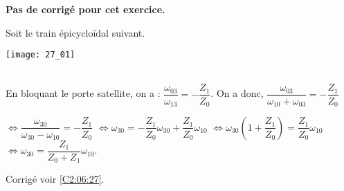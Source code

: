 \normaltrue \difficilefalse \tdifficilefalse
\correctiontrue


\setcounter{question}{0}
\ifcorrection
\else
\textbf{Pas de corrigé pour cet exercice.}
\fi

\ifprof
\else
Soit le train épicycloïdal suivant. 
\begin{center}
\texttt{[image: 27\_01]}
\end{center}
\fi


\ifprof
\else
\fi

\ifprof ~\\
 En bloquant le porte satellite, on a : $\dfrac{\omega_{03}}{\omega_{13}}=-\dfrac{Z_1}{Z_0}$. On a donc, 
$\dfrac{\omega_{03}}{\omega_{10}+\omega_{03}}=-\dfrac{Z_1}{Z_0}$

$\Leftrightarrow \dfrac{\omega_{30}}{\omega_{30}-\omega_{10}}=-\dfrac{Z_1}{Z_0}$
$\Leftrightarrow \omega_{30}=-\dfrac{Z_1}{Z_0} \omega_{30}+\dfrac{Z_1}{Z_0}\omega_{10} $
$\Leftrightarrow \omega_{30}\left( 1+\dfrac{Z_1}{Z_0} \right)=\dfrac{Z_1}{Z_0}\omega_{10} $
$\Leftrightarrow \omega_{30}=\dfrac{Z_1}{Z_0+Z_1}\omega_{10} $.
\else
\fi


\ifprof
\else
\begin{flushright}
\footnotesize{Corrigé  voir \ref{C2:06:27}.}
\end{flushright}%
\fi